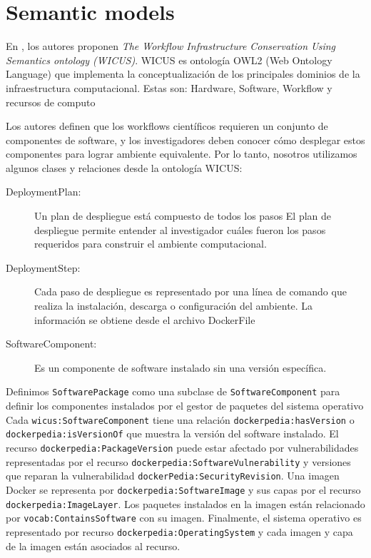 \section{Semantic models}\label{s4.1}
     
En \cite{santana2017reproducibility}, los autores proponen \emph{The Workflow Infrastructure Conservation Using Semantics ontology (WICUS)}. WICUS es ontología OWL2 (Web Ontology Language) que implementa la conceptualización de los principales dominios de la infraestructura computacional. Estas son: Hardware, Software, Workflow y recursos de computo
     
Los autores definen que los workflows científicos requieren un conjunto de componentes de software, y los investigadores deben conocer cómo desplegar estos componentes para lograr ambiente equivalente.
Por lo tanto, nosotros utilizamos algunos clases y relaciones desde la ontología WICUS:

\begin{description}
	\item [DeploymentPlan:]  Un plan de despliegue está compuesto de todos los pasos  	El plan de despliegue permite entender al investigador cuáles fueron los pasos requeridos para construir el ambiente computacional.
	\item [DeploymentStep:] Cada paso de despliegue es representado por una línea de comando que realiza la instalación, descarga o configuración del ambiente. La información se obtiene desde el archivo DockerFile
	\item [SoftwareComponent:] Es un componente de software instalado sin una versión específica. 
\end{description} 


Definimos \verb|SoftwarePackage| como una subclase de \verb|SoftwareComponent| para definir los componentes instalados por el gestor de paquetes del sistema operativo
Cada \verb|wicus:SoftwareComponent| tiene una relación \verb|dockerpedia:hasVersion| o \verb|dockerpedia:isVersionOf| que muestra la versión del software instalado.
El recurso \verb|dockerpedia:PackageVersion| puede estar afectado por vulnerabilidades representadas por el recurso \verb|dockerpedia:SoftwareVulnerability| y versiones que reparan la vulnerabilidad \verb|dockerPedia:SecurityRevision|.
Una imagen Docker se representa por \verb|dockerpedia:SoftwareImage| y sus capas por el recurso \verb|dockerpedia:ImageLayer|. Los paquetes instalados en la imagen están relacionado por \verb|vocab:ContainsSoftware| con su imagen.
Finalmente, el sistema operativo es representado por recurso \verb|dockerpedia:OperatingSystem| y cada imagen y capa de la imagen están asociados al recurso.


